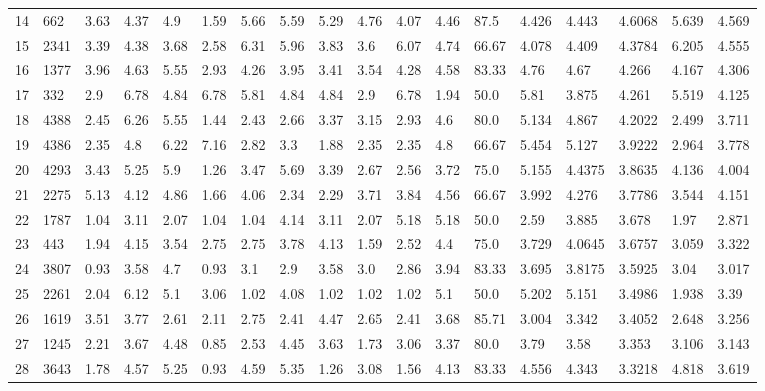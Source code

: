 \documentclass[landscape, 10pt]{report}
\begin{document}
\begin{longtable}{l || l || l | l | l | l | l | l | l | l | l | l | l || l | l | l | l | l}
14 & 662 & 3.63 & 4.37 & 4.9 & 1.59 & 5.66 & 5.59 & 5.29 & 4.76 & 4.07 & 4.46 & 87.5 & 4.426 & 4.443 & 4.6068 & 5.639 & 4.569\\ 
\rowcolor{lightgray}15 & 2341 & 3.39 & 4.38 & 3.68 & 2.58 & 6.31 & 5.96 & 3.83 & 3.6 & 6.07 & 4.74 & 66.67 & 4.078 & 4.409 & 4.3784 & 6.205 & 4.555\\ 
16 & 1377 & 3.96 & 4.63 & 5.55 & 2.93 & 4.26 & 3.95 & 3.41 & 3.54 & 4.28 & 4.58 & 83.33 & 4.76 & 4.67 & 4.266 & 4.167 & 4.306\\ 
\rowcolor{lightgray}17 & 332 & 2.9 & 6.78 & 4.84 & 6.78 & 5.81 & 4.84 & 4.84 & 2.9 & 6.78 & 1.94 & 50.0 & 5.81 & 3.875 & 4.261 & 5.519 & 4.125\\ 
18 & 4388 & 2.45 & 6.26 & 5.55 & 1.44 & 2.43 & 2.66 & 3.37 & 3.15 & 2.93 & 4.6 & 80.0 & 5.134 & 4.867 & 4.2022 & 2.499 & 3.711\\ 
\rowcolor{lightgray}19 & 4386 & 2.35 & 4.8 & 6.22 & 7.16 & 2.82 & 3.3 & 1.88 & 2.35 & 2.35 & 4.8 & 66.67 & 5.454 & 5.127 & 3.9222 & 2.964 & 3.778\\ 
20 & 4293 & 3.43 & 5.25 & 5.9 & 1.26 & 3.47 & 5.69 & 3.39 & 2.67 & 2.56 & 3.72 & 75.0 & 5.155 & 4.4375 & 3.8635 & 4.136 & 4.004\\ 
\rowcolor{lightgray}21 & 2275 & 5.13 & 4.12 & 4.86 & 1.66 & 4.06 & 2.34 & 2.29 & 3.71 & 3.84 & 4.56 & 66.67 & 3.992 & 4.276 & 3.7786 & 3.544 & 4.151\\ 
22 & 1787 & 1.04 & 3.11 & 2.07 & 1.04 & 1.04 & 4.14 & 3.11 & 2.07 & 5.18 & 5.18 & 50.0 & 2.59 & 3.885 & 3.678 & 1.97 & 2.871\\ 
\rowcolor{lightgray}23 & 443 & 1.94 & 4.15 & 3.54 & 2.75 & 2.75 & 3.78 & 4.13 & 1.59 & 2.52 & 4.4 & 75.0 & 3.729 & 4.0645 & 3.6757 & 3.059 & 3.322\\ 
24 & 3807 & 0.93 & 3.58 & 4.7 & 0.93 & 3.1 & 2.9 & 3.58 & 3.0 & 2.86 & 3.94 & 83.33 & 3.695 & 3.8175 & 3.5925 & 3.04 & 3.017\\ 
\rowcolor{lightgray}25 & 2261 & 2.04 & 6.12 & 5.1 & 3.06 & 1.02 & 4.08 & 1.02 & 1.02 & 1.02 & 5.1 & 50.0 & 5.202 & 5.151 & 3.4986 & 1.938 & 3.39\\ 
26 & 1619 & 3.51 & 3.77 & 2.61 & 2.11 & 2.75 & 2.41 & 4.47 & 2.65 & 2.41 & 3.68 & 85.71 & 3.004 & 3.342 & 3.4052 & 2.648 & 3.256\\ 
\rowcolor{lightgray}27 & 1245 & 2.21 & 3.67 & 4.48 & 0.85 & 2.53 & 4.45 & 3.63 & 1.73 & 3.06 & 3.37 & 80.0 & 3.79 & 3.58 & 3.353 & 3.106 & 3.143\\ 
28 & 3643 & 1.78 & 4.57 & 5.25 & 0.93 & 4.59 & 5.35 & 1.26 & 3.08 & 1.56 & 4.13 & 83.33 & 4.556 & 4.343 & 3.3218 & 4.818 & 3.619\\ 

\end{longtable}
\end{document}
